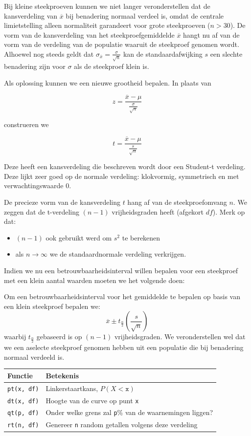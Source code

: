 {Bij kleine steekproeven kunnen we niet langer veronderstellen dat de kansverdeling van $\overline{x}$ bij benadering
normaal verdeel is, omdat de centrale limietstelling alleen normaliteit garandeert voor grote steekproeven ($n >30$). De vorm
van de kansverdeling van het steekproefgemiddelde $\overline{x}$ hangt nu af van de vorm van de verdeling van de populatie waaruit de
steekproef genomen wordt. Alhoewel nog steeds geldt dat $\sigma_{\overline{x}} = \frac{\sigma}{\sqrt{n}}$ kan
de standaardafwijking $s$ een slechte benadering zijn voor $\sigma$ als de steekproef klein is.

Als oplossing kunnen we een nieuwe grootheid bepalen. In plaats van

\[ z = \frac{\overline{x} - \mu}{\frac{\sigma}{\sqrt{n}}} \]

construeren we

\[ t = \frac{\overline{x} - \mu}{\frac{s}{\sqrt{n}}} \]

Deze heeft een kansverdeling die beschreven wordt door een Student-t verdeling. Deze lijkt zeer goed op de normale verdeling: klokvormig, symmetrisch en met verwachtingswaarde 0.

De precieze vorm van de kansverdeling $t$ hang af van de steekproefomvang $n$. We zeggen dat de t-verdeling $(n-1)$ vrijheidsgraden heeft (afgekort $df$).
Merk op dat:
\begin{itemize}
  \item $(n-1)$ ook gebruikt werd om $s^{2}$ te berekenen
  \item als $n \rightarrow \infty$ we de standaardnormale verdeling verkrijgen.
\end{itemize}

Indien we nu een betrouwbaarheidsinterval willen bepalen voor een steekproef met een klein aantal waarden moeten we het volgende doen:

\begin{definition}
  Om een betrouwbaarheidsinterval voor het gemiddelde te bepalen op basis van een klein steekproef bepalen we:
  \[ \overline{x} \pm t_{\frac{\alpha}{2}}(\frac{s}{\sqrt{n}}) \]
  waarbij $t_{\frac{\alpha}{2}}$ gebaseerd is op $(n-1)$ vrijheidsgraden. We veronderstellen wel dat we een aselecte steekproef genomen hebben uit
  een populatie die bij benadering normaal verdeeld is.
\end{definition}

\begin{table}
  \centering
  \begin{tabular}{ll}
  	\textbf{Functie} & \textbf{Betekenis}                                             \\ \midrule
  	\verb|pt(x, df)| & Linkerstaartkans, $P(X<\mathtt{x})$                            \\
  	\verb|dt(x, df)| & Hoogte van de curve op punt \texttt{x}                         \\
  	\verb|qt(p, df)| & Onder welke grens zal \texttt{p}\% van de waarnemingen liggen? \\
  	\verb|rt(n, df)| & Genereer \texttt{n} random getallen volgens deze verdeling
  \end{tabular}


\end{table}}
